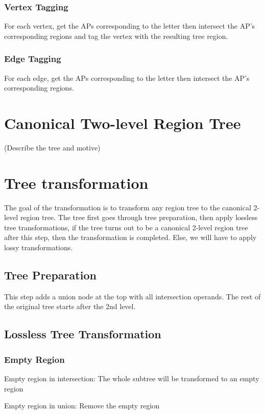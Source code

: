 \documentclass[letterpaper, 10pt, conference]{ieeeconf}   %
\begin{document}
\subsubsection{Vertex Tagging}
For each vertex, get the APs corresponding to the letter then intersect the
AP's corresponding regions and tag the vertex with the resulting tree region.
\subsubsection{Edge Tagging}
For each edge, get the APs corresponding to the letter then intersect the AP's
corresponding regions.

\section{Canonical Two-level Region Tree}

(Describe the tree and motive)

\section{Tree transformation}
The goal of the transformation is to transform any region tree to the canonical
2-level region tree. The tree first goes through tree preparation, then apply
lossless tree transformations, if the tree turns out to be a canonical 2-level
region tree after this step, then the transformation is completed. Else, we
will have to apply lossy transformations.

\subsection{Tree Preparation}
This step adds a union node at the top with all intersection operands. The rest
of the original tree starts after the 2nd level.

\subsection{Lossless Tree Transformation}

\subsubsection{Empty Region}

Empty region in intersection:
The whole subtree will be transformed to an empty region

Empty region in union:
Remove the empty region
		
\end{document}
